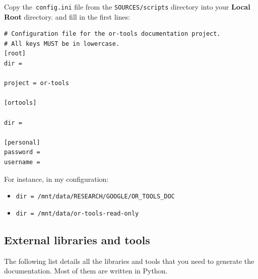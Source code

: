 \documentclass[a4paper,10pt]{article}
\newcommand{\code}[1]{\texttt{#1}}
\begin{document}
Copy the~\code{config.ini} file from the \code{SOURCES/scripts} directory into your {\bf Local Root} directory. and fill in 
the first lines:

\begin{verbatim}
# Configuration file for the or-tools documentation project.
# All keys MUST be in lowercase.
[root]
dir = 

project = or-tools

[ortools]

dir = 

[personal]
password = 
username = 
\end{verbatim}

For instance, in my configuration:

\begin{itemize}
\item \code{dir = /mnt/data/RESEARCH/GOOGLE/OR\_TOOLS\_DOC}
\item \code{dir = /mnt/data/or-tools-read-only}
\end{itemize}

\subsection{External libraries and tools}

The following list details all the libraries and tools that you need to generate the documentation. Most of them are written in Python.
\end{document}

